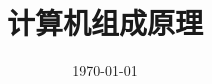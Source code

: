 \documentclass[a4paper,12pt]{article}
\begin{document}
    \title{计算机组成原理}
    \date{\today}
    \maketitle
    \renewcommand{\contentsname}{}
    \tableofcontents
    \newpage

    

    

    

    

    

    
\end{document}
